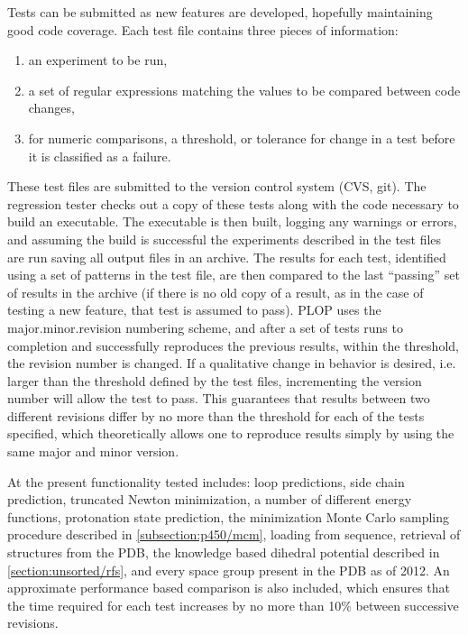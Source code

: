 Tests can be submitted as new features are developed, hopefully maintaining good code coverage.
Each test file contains three pieces of information:
\begin{enumerate}
\item an experiment to be run,
\item a set of regular expressions matching the values to be compared between code changes,
\item for numeric comparisons, a threshold, or tolerance for change in a test before it is classified as a failure.
\end{enumerate}
These test files are submitted to the version control system (CVS, git).
The regression tester checks out a copy of these tests along with the code necessary to build an executable.
The executable is then built, logging any warnings or errors, and assuming the build is successful the experiments described in the test files are run saving all output files in an archive.
The results for each test, identified using a set of patterns in the test file, are then compared to the last ``passing'' set of results in the archive (if there is no old copy of a result, as in the case of testing a new feature, that test is assumed to pass).
PLOP uses the major.minor.revision numbering scheme, and after a set of tests runs to completion and successfully reproduces the previous results, within the threshold, the revision number is changed.
If a qualitative change in behavior is desired, i.e. larger than the threshold defined by the test files, incrementing the version number will allow the test to pass.
This guarantees that results between two different revisions differ by no more than the threshold for each of the tests specified, which theoretically allows one to reproduce results simply by using the same major and minor version.

At the present functionality tested includes: loop predictions, side chain prediction, truncated Newton minimization, a number of different energy functions, protonation state prediction, the minimization Monte Carlo sampling procedure described in \ref{subsection:p450/mcm}, loading from sequence, retrieval of structures from the PDB, the knowledge based dihedral potential described in \ref{section:unsorted/rfs}, and every space group present in the PDB as of 2012.
An approximate performance based comparison is also included, which ensures that the time required for each test increases by no more than 10\% between successive revisions.

